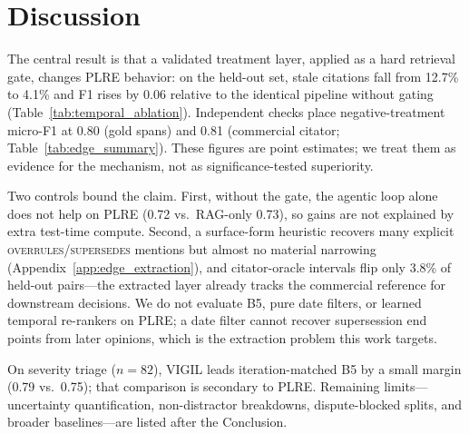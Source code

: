 \section{Discussion}
\label{sec:discussion}

The central result is that a validated treatment layer, applied as a hard retrieval gate, changes PLRE behavior: on the held-out set, stale citations fall from 12.7\% to 4.1\% and F1 rises by 0.06 relative to the identical pipeline without gating (Table~\ref{tab:temporal_ablation}). Independent checks place negative-treatment micro-F1 at 0.80 (gold spans) and 0.81 (commercial citator; Table~\ref{tab:edge_summary}). These figures are point estimates; we treat them as evidence for the mechanism, not as significance-tested superiority.

Two controls bound the claim. First, without the gate, the agentic loop alone does not help on PLRE (0.72 vs.\ RAG-only 0.73), so gains are not explained by extra test-time compute. Second, a surface-form heuristic recovers many explicit \textsc{overrules}/\textsc{supersedes} mentions but almost no material narrowing (Appendix~\ref{app:edge_extraction}), and citator-oracle intervals flip only 3.8\% of held-out pairs---the extracted layer already tracks the commercial reference for downstream decisions. We do not evaluate B5, pure date filters, or learned temporal re-rankers on PLRE; a date filter cannot recover supersession end points from later opinions, which is the extraction problem this work targets.

On severity triage ($n{=}82$), VIGIL leads iteration-matched B5 by a small margin (0.79 vs.\ 0.75); that comparison is secondary to PLRE. Remaining limits---uncertainty quantification, non-distractor breakdowns, dispute-blocked splits, and broader baselines---are listed after the Conclusion.
